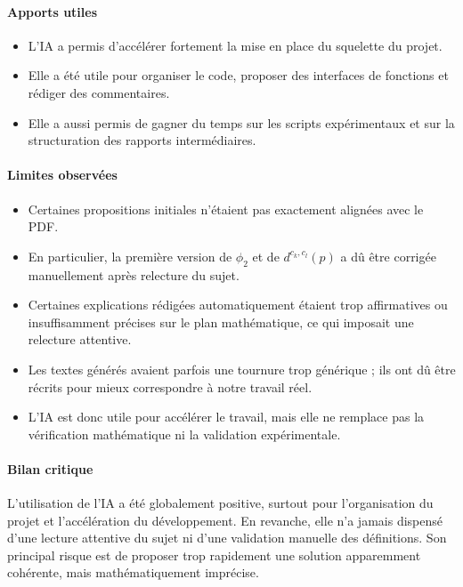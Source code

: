 \documentclass[11pt,a4paper]{article}
\begin{document}
\paragraph{Apports utiles}
\begin{itemize}[leftmargin=*]
    \item L'IA a permis d'acc\'el\'erer fortement la mise en place du squelette du projet.
    \item Elle a \'et\'e utile pour organiser le code, proposer des interfaces de fonctions et r\'ediger des commentaires.
    \item Elle a aussi permis de gagner du temps sur les scripts exp\'erimentaux et sur la structuration des rapports interm\'ediaires.
\end{itemize}

\paragraph{Limites observ\'ees}
\begin{itemize}[leftmargin=*]
    \item Certaines propositions initiales n'\'etaient pas exactement align\'ees avec le PDF.
    \item En particulier, la premi\`ere version de \(\phi_2\) et de \(d^{c_k,c_l}(p)\) a d\^u \^etre corrig\'ee manuellement apr\`es relecture du sujet.
    \item Certaines explications r\'edig\'ees automatiquement \'etaient trop affirmatives ou insuffisamment pr\'ecises sur le plan math\'ematique, ce qui imposait une relecture attentive.
    \item Les textes g\'en\'er\'es avaient parfois une tournure trop g\'en\'erique ; ils ont d\^u \^etre r\'ecrits pour mieux correspondre \`a notre travail r\'eel.
    \item L'IA est donc utile pour acc\'el\'erer le travail, mais elle ne remplace pas la v\'erification math\'ematique ni la validation exp\'erimentale.
\end{itemize}

\paragraph{Bilan critique}
L'utilisation de l'IA a \'et\'e globalement positive, surtout pour l'organisation du projet et l'acc\'el\'eration du d\'eveloppement. En revanche, elle n'a jamais dispens\'e d'une lecture attentive du sujet ni d'une validation manuelle des d\'efinitions. Son principal risque est de proposer trop rapidement une solution apparemment coh\'erente, mais math\'ematiquement impr\'ecise.
\end{document}
